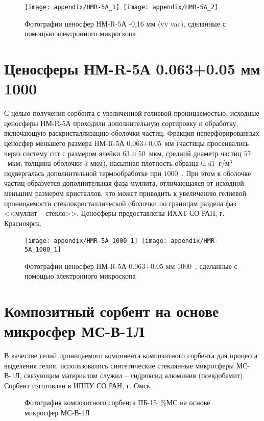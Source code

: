 \begin{figure}[h!]
	\centering
	\texttt{[image: appendix/HMR-5A\_1]}~\texttt{[image: appendix/HMR-5A\_2]}
	\caption{Фотографии ценосфер  НМ-R-5А -0,16 мм (vv vac), сделанные с помощью электронного микроскопа}
	\label{pic:HMR-5A_1}  
\end{figure}


\newpage
\section{Ценосферы НМ-R-5А 0.063+0.05 мм 1000~\textcelsius}

С целью получения сорбента с увеличенной гелиевой проницаемостью, исходные ценосферы НМ-R-5А проходили дополнительную сортировку и обработку, включающую раскристаллизацию оболочки частиц. Фракция неперфорированных ценосфер меньшего размера НМ-R-5А 0.063+0.05~мм (частицы просеивались через систему сит с размером ячейки $63$ и $50$~мкм, средний диаметр частиц $57$~мкм, толщина оболочки $3$ мкм), насыпная плотность образца $0,41$~г/м$^3$ подвергалась дополнительной термообработке при $1000$~\textcelsius. При этом в оболочке частиц образуется дополнительная фаза муллита, отличающаяся от исходной меньшим размером кристаллов, что может приводить к увеличению гелиевой проницаемости стеклокристаллической оболочки по границам раздела фаз <<муллит – стекло>>.  Ценосферы предоставлены ИХХТ СО РАН, г. Красноярск.


\begin{figure}[h!]
	\centering
	\texttt{[image: appendix/HMR-5A\_1000\_1]}~\texttt{[image: appendix/HMR-5A\_1000\_1]}
	\caption{Фотографии ценосфер  НМ-R-5А 0.063+0.05 мм 1000~\textcelsius, сделанные с помощью электронного микроскопа}
	\label{pic:HMR-5A_1000_1}  
\end{figure}

\newpage
\section{Композитный сорбент на основе микросфер МС-В-1Л}

В качестве гелий проницаемого компонента композитного сорбента для процесса выделения гелия, использовались синтетические стеклянные микросферы МС-В-1Л, связующим материалом служил – гидроксид алюминия (псевдобемит). Сорбент изготовлен в ИППУ СО РАН, г. Омск.

\begin{figure}[h!]
	\centering
	\caption{Фотография композитного сорбента	ПБ-15~\%МС  на основе микросфер МС-В-1Л}
	\label{pic:comp_sorb_MS-V-1L}  
\end{figure}



